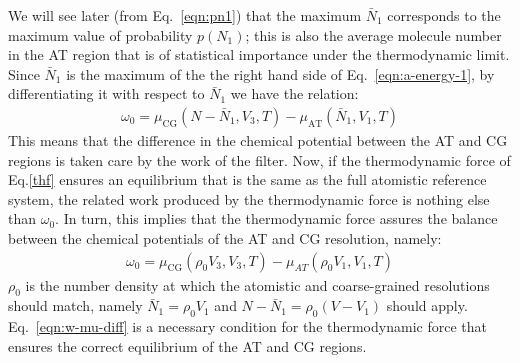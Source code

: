 \documentclass[aip,jcp,a4paper,reprint,onecolumn]{revtex4-1}
\newcommand{\redc}[1]{{\color{red} #1}}
\newcommand{\AT}{{\textrm{{AT}}}}
\newcommand{\CG}{{\textrm{CG}}}
\begin{document}
We will see later (from Eq.~\eqref{eqn:pn1})
that the maximum $\bar N_1$ corresponds to the maximum
value of probability $p(N_1)$; this is also the average molecule
number in the AT region that is of statistical importance
under the thermodynamic limit.
\redc{Since $\bar
N_1$ is the maximum of the the right hand side of
Eq.~\eqref{eqn:a-energy-1}, by differentiating it with respect to $\bar N_1$ we have the relation:}
\begin{align}
  \omega_0 = \mu_{\CG}(N - \bar N_1, V_3, T)  - \mu_{\AT}(\bar N_1, V_1, T)
\end{align}
This means that the difference in the chemical potential between the AT and CG
regions is taken care by the work of the filter.
Now, if the thermodynamic force of Eq.\ref{thf} ensures an
equilibrium that is the same as the full atomistic reference system,
the related work produced by the thermodynamic force is nothing else than $\omega_0 $.
In turn, this implies that the thermodynamic force assures the balance between the chemical potentials of the AT and CG resolution,
namely:
\begin{align}\label{eqn:w-mu-diff}
  \omega_0 = \mu_{\CG}(\rho_0V_3, V_3, T) - \mu_{AT}(\rho_0 V_1, V_1, T)
\end{align}
$\rho_0$ is the number density at which the atomistic and coarse-grained
resolutions should match,
namely $\bar N_1 = \rho_0V_1$ and $N - \bar N_1 = \rho_0(V - V_1)$ should apply.
Eq.~\eqref{eqn:w-mu-diff} is a necessary
condition for the thermodynamic force that ensures
the correct equilibrium of the AT and CG regions.\\
\end{document}
